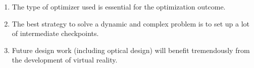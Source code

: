 \documentclass{dissertation}
\begin{document}
\begin{enumerate}
\item The type of optimizer used is essential for the optimization outcome.

\item The best strategy to solve a dynamic and complex problem is to set up a lot of intermediate checkpoints.  


\item Future design work (including optical design) will benefit tremendously from the development of virtual reality.



\end{enumerate}
\end{document}
